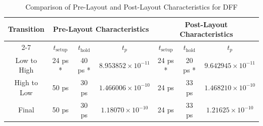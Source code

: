 \documentclass[conference]{IEEEtran}
\begin{document}
\begin{table}[ht]
\centering
\caption{Comparison of Pre-Layout and Post-Layout Characteristics for DFF}
\begin{tabular}{|c|c|c|c|c|c|c|}
\hline
\multirow{2}{*}{\textbf{Transition}} & \multicolumn{3}{c|}{\textbf{Pre-Layout Characteristics}} & \multicolumn{3}{c|}{\textbf{Post-Layout Characteristics}} \\ \cline{2-7}
& \boldmath$t_{\text{setup}}$ & \boldmath$t_{\text{hold}}$ & \boldmath$t_p$ & \boldmath$t_{\text{setup}}$ & \boldmath$t_{\text{hold}}$ & \boldmath$t_p$ \\ \hline
Low to High & 24 ps * & 40 ps * & $8.953852 \times 10^{-11}$ & 24 ps * & 20 ps * & $9.642945 \times 10^{-11}$ \\ \hline
High to Low & 50 ps & 30 ps & $1.466006 \times 10^{-10}$ & 24 ps & 33 ps & $1.468210 \times 10^{-10}$ \\ \hline
Final & 50 ps & 30 ps & $1.18070 \times 10^{-10}$ & 24 ps & 33 ps & $1.21625 \times 10^{-10}$ \\ \hline
\end{tabular}
\label{tab:dff_comparison}
\end{table}
\end{document}
